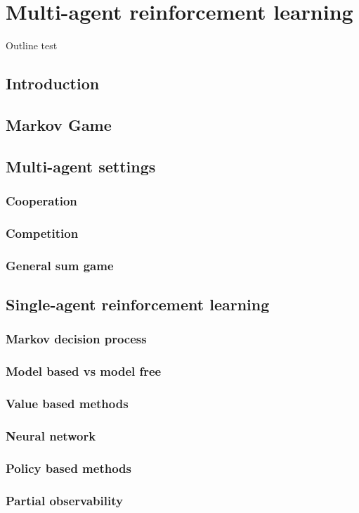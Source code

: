 \chapter{Multi-agent reinforcement learning}\label{ch:marl}

\begin{chapter_outline}
Outline test

\end{chapter_outline}
\section{Introduction}
\section{Markov Game}
\section{Multi-agent settings}
\subsection{Cooperation}
\subsection{Competition}
\subsection{General sum game}
\section{Single-agent reinforcement learning}
\subsection{Markov decision process}
\subsection{Model based vs model free}
\subsection{Value based methods}
\subsection{Neural network}
\subsection{Policy based methods}
\subsection{Partial observability}